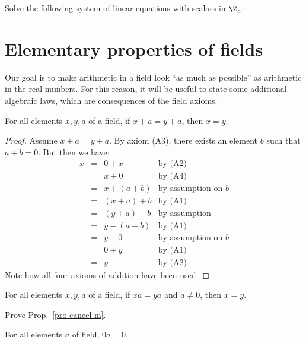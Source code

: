 {\begin{nproblem}
  Solve the following system of linear equations with scalars in
  $\Z_5$:
  \[ 
  \]
\end{nproblem}

\section{Elementary properties of fields}

Our goal is to make arithmetic in a field look ``as much as possible''
as arithmetic in the real numbers. For this reason, it will be useful
to state some additional algebraic laws, which are consequences of the
field axioms.

\begin{proposition}
  For all elements $x,y,a$ of a field, if $x+a=y+a$, then $x=y$. 
\end{proposition}

\begin{proof}
  Assume $x+a=y+a$. By axiom (A3), there exists an element $b$ such
  that $a+b=0$. But then we have:
  \[ \begin{array}{llll}
    x &=& 0+x & \mbox{by (A2)} \\
    &=& x+0 & \mbox{by (A4)} \\
    &=& x+(a+b) & \mbox{by assumption on $b$} \\
    &=& (x+a)+b & \mbox{by (A1)} \\
    &=& (y+a)+b & \mbox{by assumption} \\
    &=& y+(a+b) & \mbox{by (A1)} \\
    &=& y+0 & \mbox{by assumption on $b$} \\
    &=& 0+y & \mbox{by (A1)} \\
    &=& y & \mbox{by (A2)}
  \end{array}
  \]
  Note how all four axioms of addition have been used. \eot
\end{proof}

\begin{proposition}\label{pro-cancel-m}
  For all elements $x,y,a$ of a field, if $xa=ya$ and $a\neq 0$, then
  $x=y$.
\end{proposition}

\begin{nproblem}
  Prove Prop.~\ref{pro-cancel-m}.
\end{nproblem}

\begin{proposition}\label{pro-0a}
  For all elements $a$ of field, $0a=0$.
\end{proposition}

}
